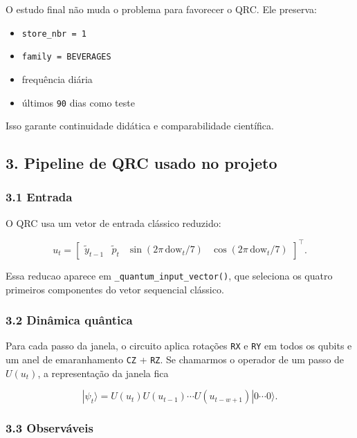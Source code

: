 \documentclass[12pt]{article}
\providecommand{\tightlist}{%
          \setlength{\itemsep}{0pt}\setlength{\parskip}{0pt}}
\begin{document}
O estudo final não muda o problema para favorecer o QRC. Ele preserva:

\begin{itemize}
\tightlist
\item
  \texttt{store\_nbr\ =\ 1}
\item
  \texttt{family\ =\ BEVERAGES}
\item
  frequência diária
\item
  últimos \texttt{90} dias como teste
\end{itemize}

Isso garante continuidade didática e comparabilidade científica.

\subsection{3. Pipeline de QRC usado no projeto}\label{3-pipeline-de-qrc-usado-no-projeto}

\subsubsection{3.1 Entrada}\label{31-entrada}

O QRC usa um vetor de entrada clássico reduzido:

\[
u_t =
\begin{bmatrix}
\widetilde{y}_{t-1} &
\widetilde{p}_t &
\sin(2\pi \, \mathrm{dow}_t / 7) &
\cos(2\pi \, \mathrm{dow}_t / 7)
\end{bmatrix}^\top.
\]

Essa reducao aparece em \texttt{\_quantum\_input\_vector()}, que seleciona os quatro primeiros componentes do vetor sequencial clássico.

\subsubsection{3.2 Dinâmica quântica}\label{32-dinuxe2mica-quuxe2ntica}

Para cada passo da janela, o circuito aplica rotações \texttt{RX} e \texttt{RY} em todos os qubits e um anel de emaranhamento \texttt{CZ} + \texttt{RZ}. Se chamarmos o operador de um passo de \(U(u_t)\), a representação da janela fica

\[
|\psi_t\rangle = U(u_t) U(u_{t-1}) \cdots U(u_{t-w+1}) |0 \cdots 0\rangle.
\]

\subsubsection{3.3 Observáveis}\label{33-observuxe1veis}
\end{document}
